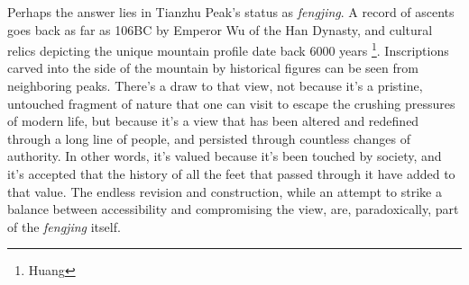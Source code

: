 Perhaps the answer lies in Tianzhu Peak's status as \textit{fengjing}. A record
of ascents goes back as far as 106BC by Emperor Wu of the Han Dynasty, and
cultural relics depicting the unique mountain profile date back 6000 years
\footnote{Huang}. Inscriptions carved into the side of the mountain by
historical figures can be seen from neighboring peaks. There's a draw to that
view, not because it's a pristine, untouched fragment of nature that one can
visit to escape the crushing pressures of modern life, but because it's a view
that has been altered and redefined through a long line of people,
and persisted through countless changes of authority. In other words, it's
valued because it's been touched by society, and it's accepted that the history
of all the feet that passed through it have added to that value. The endless
revision and construction, while an attempt to strike a balance between
accessibility and compromising the view, are, paradoxically, part of the
\textit{fengjing} itself.
